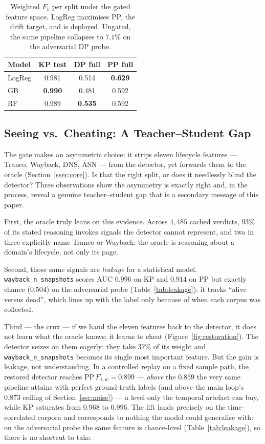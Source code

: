 \begin{table}[H]
\centering
\caption{Weighted $F_1$ per split under the gated feature space. LogReg
maximises PP, the drift target, and is deployed. Ungated, the same pipeline
collapses to $7.1\%$ on the adversarial DP probe.}
\label{tab:xdataset}
\small
\begin{tabular}{@{}lccc@{}}
\toprule
Model & KP test & DP full & PP full \\
\midrule
LogReg & 0.981 & 0.514 & \textbf{0.629} \\
GB     & \textbf{0.990} & 0.481 & 0.592 \\
RF     & 0.989 & \textbf{0.535} & 0.592 \\
\bottomrule
\end{tabular}
\end{table}

\subsection{Seeing vs.\ Cheating: A Teacher--Student Gap}
\label{ssec:eval-gap}

The gate makes an asymmetric choice: it strips eleven lifecycle features ---
Tranco, Wayback, DNS, ASN --- from the detector, yet forwards them to the oracle
(Section~\ref{ssec:core}). Is that the right split, or does it needlessly blind
the detector? Three observations show the asymmetry is exactly right and, in the
process, reveal a genuine teacher--student gap that is a secondary message of
this paper.

First, the oracle truly leans on this evidence. Across $4{,}485$ cached verdicts,
$93\%$ of its stated reasoning invokes signals the detector cannot represent, and
two in three explicitly name Tranco or Wayback: the oracle is reasoning about a
domain's lifecycle, not only its page.

Second, those same signals are \emph{leakage} for a statistical model.
\texttt{wayback\_n\_snapshots} scores AUC $0.996$ on KP and $0.914$ on PP but
exactly chance ($0.504$) on the adversarial probe (Table~\ref{tab:leakage}): it
tracks ``alive versus dead'', which lines up with the label only because of when
each corpus was collected.

Third --- the crux --- if we hand the eleven features back to the detector, it
does not learn what the oracle knows; it learns to cheat
(Figure~\ref{fig:restoration}). The detector seizes on them eagerly: they take
$37\%$ of its weight and \texttt{wayback\_n\_snapshots} becomes its single most
important feature. But the gain is leakage, not understanding. In a controlled
replay on a fixed sample path, the restored detector reaches
$\mathrm{PP}\,F_{1,w}=0.899$ --- \emph{above} the $0.859$ the very same pipeline
attains with perfect ground-truth labels (and above the main loop's $0.873$
ceiling of Section~\ref{sec:noise}) --- a level only the temporal artefact can
buy, while KP saturates from $0.968$ to $0.996$. The lift lands precisely on the
time-correlated corpora and corresponds to nothing the model could generalise
with: on the adversarial probe the same feature is chance-level
(Table~\ref{tab:leakage}), so there is no shortcut to take.

